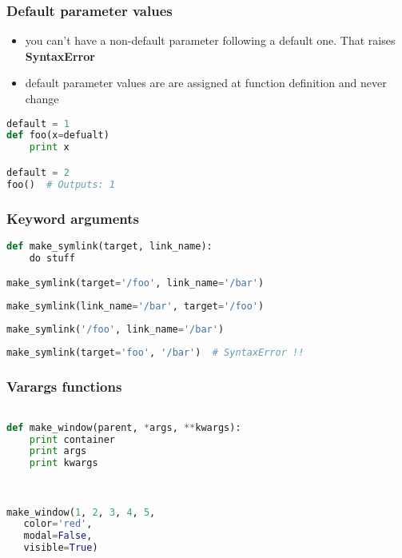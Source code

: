 \documentclass{beamer}
\begin{document}
\begin{frame}[fragile]
\frametitle{Default parameter values}

\begin{itemize}
  \item you can't have a non-default parameter following a default one. That raises {\bf SyntaxError}
  \item default parameter values are are assigned at function definition and never change
\end{itemize}

\begin{lstlisting}[language=python]
default = 1
def foo(x=defualt)
    print x

default = 2
foo()  # Outputs: 1
\end{lstlisting}
\end{frame}

\begin{frame}[fragile]
\frametitle{Keyword arguments}

\begin{lstlisting}[language=python]
def make_symlink(target, link_name):
    do stuff

make_symlink(target='/foo', link_name='/bar')
\end{lstlisting}
\pause
\begin{lstlisting}[language=python]
make_symlink(link_name='/bar', target='/foo')
\end{lstlisting}
\pause
\begin{lstlisting}[language=python]
make_symlink('/foo', link_name='/bar')
\end{lstlisting}
\pause
\begin{lstlisting}[language=python]
make_symlink(target='foo', '/bar')  # SyntaxError !!
\end{lstlisting}
\end{frame}


\begin{frame}[fragile]
\frametitle{Varargs functions}

\begin{lstlisting}[language=python]

def make_window(parent, *args, **kwargs):
    print container
    print args     
    print kwargs   
                   
                   

make_window(1, 2, 3, 4, 5,
   color='red',
   modal=False,
   visible=True)

\end{lstlisting}
\end{frame}
\end{document}

